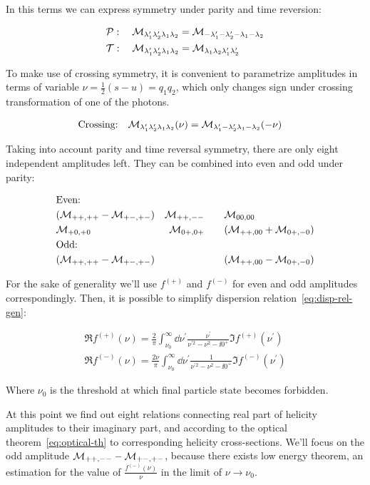 In this terms we can express symmetry under parity and time reversion:

\begin{align}
    & \mathcal{P}:\quad \mathcal{M}_{\lambda_1^\prime \lambda_2^\prime \lambda_1 \lambda_2} = \mathcal{M}_{-\lambda_1^\prime -\lambda_2^\prime -\lambda_1 -\lambda_2} \\
    & \mathcal{T}:\quad \mathcal{M}_{\lambda_1^\prime \lambda_2^\prime \lambda_1 \lambda_2} = \mathcal{M}_{\lambda_1 \lambda_2 \lambda_1^\prime \lambda_2^\prime}
\end{align}

To make use of crossing symmetry, it is convenient to parametrize amplitudes in terms of variable $\nu = \frac{1}{2} (s - u) = q_1 q_2$, which only changes sign under crossing transformation of one of the photons.

\begin{align}
    & \text{Crossing:}\quad \mathcal{M}_{\lambda_1^\prime \lambda_2^\prime \lambda_1 \lambda_2}(\nu) = \mathcal{M}_{\lambda_1^\prime -\lambda_2^\prime \lambda_1 -\lambda_2}(-\nu)
\end{align}

Taking into account parity and time reversal symmetry, there are only eight independent amplitudes left. They can be combined into even and odd under parity:

\begin{align}
    &\text{Even:} && \\ \nonumber
    &(\mathcal{M}_{++,++}-\mathcal{M}_{+-,+-}) &\mathcal{M}_{++,--}\qquad &\mathcal{M}_{00,00}\\
    &\mathcal{M}_{+0,+0} &\mathcal{M}_{0+,0+}\qquad &(\mathcal{M}_{++,00} + \mathcal{M}_{0+,-0})\\
    &\text{Odd:} && \\ \nonumber
    &(\mathcal{M}_{++,++} - \mathcal{M}_{+-,+-}) & &(\mathcal{M}_{++,00} - \mathcal{M}_{0+,-0})
\end{align}

For the sake of generality we'll use $f^{(+)}$ and $f^{(-)}$ for even and odd amplitudes correspondingly. Then, it is possible to simplify dispersion relation~\cref{eq:disp-rel-gen}:

\begin{align}
    \Re f^{(+)}(\nu) = \frac{2}{\pi} \int_{\nu_0}^{\infty} \dd{\nu^\prime} \frac{\nu^\prime}{\nu^{\prime 2} - \nu^2 - \ii 0^+} \Im f^{(+)}(\nu^\prime) \\
    \Re f^{(-)}(\nu) = \frac{2\nu}{\pi} \int_{\nu_0}^{\infty} \dd{\nu^\prime} \frac{1}{\nu^{\prime 2} - \nu^2 - \ii 0^+} \Im f^{(-)}(\nu^\prime)
\end{align}

Where $\nu_0$ is the threshold at which final particle state becomes forbidden.

At this point we find out eight relations connecting real part of helicity amplitudes to their imaginary part, and according to the optical theorem~\cref{eq:optical-th} to corresponding helicity cross-sections. We'll focus on the odd amplitude $\mathcal{M}_{++,--} - \mathcal{M}_{+-,+-}$, because there exists low energy theorem, an estimation for the value of $\frac{f^{(-)}(\nu)}{\nu}$ in the limit of $\nu \rightarrow \nu_0$.

